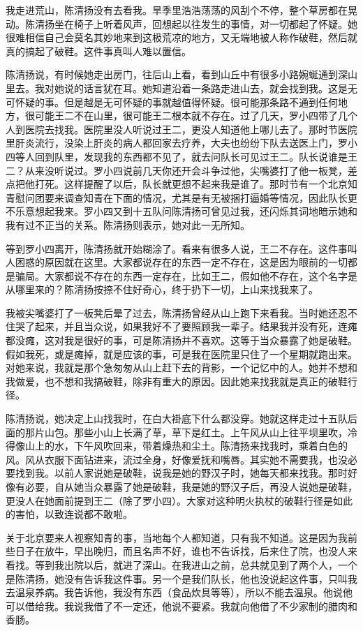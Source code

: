  我走进荒山，陈清扬没有去看我。旱季里浩浩荡荡的风刮个不停，整个草房都在晃动。陈清扬坐在椅子上听着风声，回想起以往发生的事情，对一切都起了怀疑。她很难相信自己会莫名其妙地来到这极荒凉的地方，又无端地被人称作破鞋，然后就真的搞起了破鞋。这件事真叫人难以置信。 
 
 陈清扬说，有时候她走出房门，往后山上看，看到山丘中有很多小路婉蜒通到深山里去。我对她说的话言犹在耳。她知道沿着一条路走进山去，就会找到我。这是无可怀疑的事。但是越是无可怀疑的事就越值得怀疑。很可能那条路不通到任何地方，很可能王二不在山里，很可能王二根本就不存在。过了几天，罗小四带了几个人到医院去找我。医院里没人听说过王二，更没人知道他上哪儿去了。那时节医院里肝炎流行，没染上肝炎的病人都回家去疗养，大夫也纷纷下队去送医上门，罗小四等人回到队里，发现我的东西都不见了，就去问队长可见过王二。队长说谁是王二？从来没听说过。罗小四说前几天你还开会斗争过他，尖嘴婆打了他一板凳，差点把他打死。这样提醒了以后，队长就更想不起来我是谁了。那时节有一个北京知青慰问团要来调查知青在下面的情况，尤其是有无被捆打逼婚等情况，因此队长更不乐意想起我来。罗小四又到十五队问陈清扬可曾见过我，还闪烁其词地暗示她和我有过不正当的关系。陈清扬则表示，她对此一无所知。 
 
 等到罗小四离开，陈清扬就开始糊涂了。看来有很多人说，王二不存在。这件事叫人困惑的原因就在这里。大家都说存在的东西一定不存在，这是因为眼前的一切都是骗局。大家都说不存在的东西一定存在，比如王二，假如他不存在，这个名字是从哪里来的？陈清扬按捺不住好奇心，终于扔下一切，上山来找我来了。 
 
 我被尖嘴婆打了一板凳后晕了过去，陈清扬曾经从山上跑下来看我。当时她还忍不住哭了起来，并且当众说，如果我好不了要照顾我一辈子。结果我并没有死，连瘫都没瘫，这对我是很好的事，可是陈清扬并不喜欢。这等于当众暴露了她是破鞋。假如我死，或是瘫掉，就是应该的事，可是我在医院里只住了一个星期就跑出来。对她来说，我就是那个急匆匆从山上赶下去的背影，一个记忆中的人。她并不想和我做爱，也不想和我搞破鞋，除非有重大的原因。因此她来找我就是真正的破鞋行径。 
 
 陈清扬说，她决定上山找我时，在白大褂底下什么都没穿。她就这样走过十五队后面的那片山包。那些小山上长满了草，草下是红土。上午风从山上往平坝里吹，冷得像山上的水，下午风吹回来，带着燥热和尘土。陈清扬来找我时，乘着白色的风。风从衣服下面钻进来，流过全身，好像爱抚和嘴唇。其实她不需要我，也没必要找到我。以前人家说她是破鞋，说我是她的野汉子时，她每天都来找我。那时好像有必要，自从她当众暴露了她是破鞋，我是她的野汉子后，再没人说她是破鞋，更没人在她面前提到王二（除了罗小四）。大家对这种明火执杖的破鞋行径是如此的害怕，以致连说都不敢啦。 
 
 关于北京要来人视察知青的事，当地每个人都知道，只有我不知道。这是因为我前些日子在放牛，早出晚归，而且名声不好，谁也不告诉找，后来住了院，也没人来看找。等到我出院以后，就进了深山。在我进山之前，总共就见到了两个人，一个是陈清扬，她没有告诉我这件事。另一个是我们队长，他也没说起这件事，只叫我去温泉养病。我告诉他，我没有东西（食品炊具等等），所以不能去温泉。他说他可以借给我。我说我借了不一定还，他说不要紧。我就向他借了不少家制的腊肉和香肠。 
 
